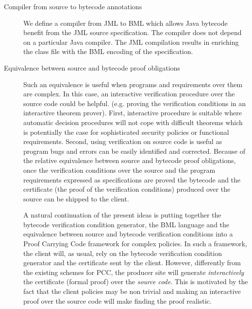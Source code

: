 \begin{description}
 

   \item [Compiler from source to bytecode annotations]
         We define a compiler from JML to BML which  
	 allows Java  bytecode benefit from the JML source specification.
	 The compiler does not depend on a particular Java compiler.
	 The JML compilation results in enriching the class file with the BML
	 encoding of the specification.
	 
    \item[Equivalence between source and bytecode proof obligations] Such an equivalence is useful when programs and requirements over them are complex.
         In this case, an interactive verification procedure over the source code  could be helpful.
	 (e.g. proving the verification conditions in an interactive theorem prover).
	 First, interactive  procedure is suitable where automatic decision procedures will not cope with
	 difficult theorems which is potentially the case for sophisticated security policies or functional requirements. 
	 Second, using verification on source code is useful as program bugs and errors can be easily identified and corrected.
	 Because of the relative equivalence between source and bytecode proof obligations, 
	 once the verification conditions over the source and the program requirements expressed as specifications are
	 proved the bytecode and the certificate (the proof of the verification conditions) produced over the source
	 can be shipped  to the client.

	 A natural continuation of the present ideas is putting together the bytecode verification condition generator, 
	 the  BML language and the equivalence between source and bytecode verification conditions into a Proof Carrying Code framework for complex policies.
	 In such a framework, the client
	 will, as usual, rely  on the bytecode verification condition generator and  the certificate sent by the client. 
	 However, differently from the existing schemes for PCC, the producer site will generate \textit{interactively} the certificate (formal proof) 
	 over the \textit{source code}. This is motivated by the fact that the client policies may be non trivial and making an interactive proof over the source
	 code will make finding the proof realistic.
\end{description}


